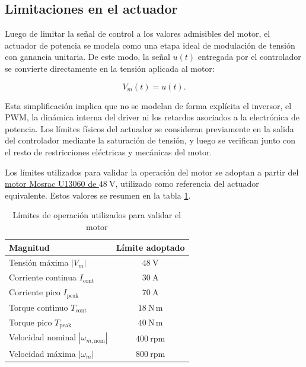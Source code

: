 \documentclass{article}
\begin{document}
\subsection{Limitaciones en el actuador}

Luego de limitar la señal de control a los valores admisibles del motor, el actuador de potencia se modela como una etapa ideal de modulación de tensión con ganancia unitaria. De este modo, la señal $u(t)$ entregada por el controlador se convierte directamente en la tensión aplicada al motor:

\begin{equation}
V_m(t)=u(t).
\end{equation}

Esta simplificación implica que no se modelan de forma explícita el inversor, el PWM, la dinámica interna del driver ni los retardos asociados a la electrónica de potencia. Los límites físicos del actuador se consideran previamente en la salida del controlador mediante la saturación de tensión, y luego se verifican junto con el resto de restricciones eléctricas y mecánicas del motor.

Los límites utilizados para validar la operación del motor se adoptan a partir del \hyperlink{ref:mosrac-u13060}{motor Mosrac U13060 de $48\ \mathrm{V}$}, utilizado como referencia del actuador equivalente. Estos valores se resumen en la tabla \ref{tab:limites_motor}.

\begin{table}[H]
\small
\centering
\caption{Límites de operación utilizados para validar el motor}
\label{tab:limites_motor}
\begin{tabular}{l c}
\toprule
\textbf{Magnitud} & \textbf{Límite adoptado} \\
\midrule
Tensión máxima $|V_m|$ & $48\ \mathrm{V}$ \\
Corriente continua $I_{\mathrm{cont}}$ & $30\ \mathrm{A}$ \\
Corriente pico $I_{\mathrm{peak}}$ & $70\ \mathrm{A}$ \\
Torque continuo $T_{\mathrm{cont}}$ & $18\ \mathrm{N\,m}$ \\
Torque pico $T_{\mathrm{peak}}$ & $40\ \mathrm{N\,m}$ \\
Velocidad nominal $|\omega_{m,\mathrm{nom}}|$ & $400\ \mathrm{rpm}$ \\
Velocidad máxima $|\omega_m|$ & $800\ \mathrm{rpm}$ \\
\bottomrule
\end{tabular}
\end{table}
\end{document}

